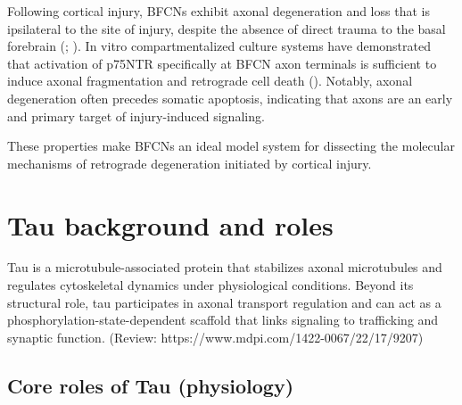 \documentclass[
  letterpaper,
  DIV=11,
  numbers=noendperiod]{scrreprt}
\begin{document}
Following cortical injury, BFCNs exhibit axonal degeneration and loss
that is ipsilateral to the site of injury, despite the absence of direct
trauma to the basal forebrain (;
). In vitro compartmentalized culture systems have demonstrated
that activation of p75NTR specifically at BFCN axon terminals is
sufficient to induce axonal fragmentation and retrograde cell death
(). Notably, axonal degeneration often precedes somatic apoptosis,
indicating that axons are an early and primary target of injury-induced
signaling.

These properties make BFCNs an ideal model system for dissecting the
molecular mechanisms of retrograde degeneration initiated by cortical
injury.

\section{Tau background and roles}\label{tau-background-and-roles}

Tau is a microtubule-associated protein that stabilizes axonal
microtubules and regulates cytoskeletal dynamics under physiological
conditions. Beyond its structural role, tau participates in axonal
transport regulation and can act as a phosphorylation-state-dependent
scaffold that links signaling to trafficking and synaptic function.
(Review: https://www.mdpi.com/1422-0067/22/17/9207)

\subsection{Core roles of Tau
(physiology)}\label{core-roles-of-tau-physiology}
\end{document}
